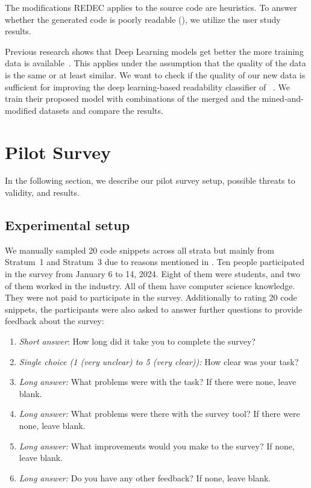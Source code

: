 \documentclass[%
class=scrreprt,
chapterprefix=false,%
open=right,%
twoside=true,%
paper=a4,%
logofile={Logo\_zentral\_farbig\_EN.png},%
thesistype=master,%
UKenglish,%
]{se2thesis}
\theoremstyle{definition}
\newcommand{\rdh}{REDEC\xspace}
\begin{document}
    The modifications \rdh applies to the source code are heuristics. To answer whether the generated code is poorly readable (), we utilize the user study results.
	
    Previous research shows that Deep Learning models get better the more training data is available~\cite{hestness2017deep}. This applies under the assumption that the quality of the data is the same or at least similar. We want to check if the quality of our new data is sufficient for improving the deep learning-based readability classifier of \citeauthor{mi2022towards}~\cite{mi2022towards}. We train their proposed model with combinations of the merged and the mined-and-modified datasets and compare the results.
	
\section{Pilot Survey} \label{Pilot Survey}
	In the following section, we describe our pilot survey setup, possible threats to validity, and results.
	
\subsection{Experimental setup}
	We manually sampled 20 code snippets across all strata but mainly from Stratum~1 and Stratum~3 due to reasons mentioned in . Ten people participated in the survey from January 6 to 14, 2024. Eight of them were students, and two of them worked in the industry. All of them have computer science knowledge. They were not paid to participate in the survey. Additionally to rating 20 code snippets, the participants were also asked to answer further questions to provide feedback about the survey:
	
	\begin{enumerate}
		\item \textit{Short answer}: How long did it take you to complete the survey?
		\item \textit{Single choice (1 (very unclear) to 5 (very clear)):} How clear was your task?
		\item \textit{Long answer:} What problems were with the task? If there were none, leave blank.
		\item \textit{Long answer:} What problems were there with the survey tool? If there were none, leave blank.
		\item \textit{Long answer:} What improvements would you make to the survey? If none, leave blank.
		\item \textit{Long answer:} Do you have any other feedback? If none, leave blank.
	\end{enumerate}
		
\end{document}
